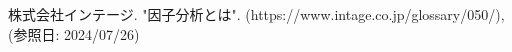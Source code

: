 \begin{thebibliography}{99}
 株式会社インテージ. "因子分析とは". (https://www.intage.co.jp/glossary/050/), (参照日: 2024/07/26)
\end{thebibliography}
